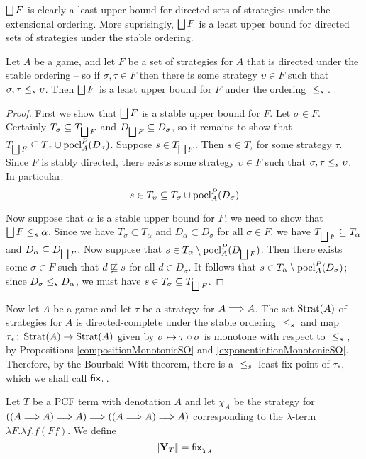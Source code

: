 \documentclass{article}
\begin{document}
$\bigsqcup F$ is clearly a least upper bound for directed sets of strategies under the extensional ordering.  More suprisingly, $\bigsqcup F$ is a least upper bound for directed sets of strategies under the stable ordering.

\begin{proposition}
  Let $A$ be a game, and let $F$ be a set of strategies for $A$ that is directed under the stable ordering -- so if $\sigma,\tau\in F$ then there is some strategy $\upsilon\in F$ such that $\sigma,\tau{\;\le_s\;}\upsilon$.  Then $\bigsqcup F$ is a least upper bound for $F$ under the ordering ${\;\le_s\;}$.
  \begin{proof}
    First we show that $\bigsqcup F$ is a stable upper bound for $F$.  Let $\sigma\in F$.  Certainly $T_\sigma\subseteq T_{\bigsqcup F}$ and $D_{\bigsqcup F}\subseteq D_\sigma$, so it remains to show that $T_{\bigsqcup F}\subseteq T_\sigma\cup \operatorname{pocl}_A^P(D_\sigma)$.  Suppose $s\in T_{\bigsqcup F}$.  Then $s\in T_\tau$ for some strategy $\tau$.  Since $F$ is stably directed, there exists some strategy $\upsilon\in F$ such that $\sigma,\tau{\;\le_s\;}\upsilon$.  In particular:
    \[
      s\in T_\upsilon \subseteq T_\sigma \cup \operatorname{pocl}_A^P(D_\sigma)
      \]

    Now suppose that $\alpha$ is a stable upper bound for $F$; we need to show that $\bigsqcup F{\;\le_s\;}\alpha$.  Since we have $T_\sigma\subset T_\alpha$ and $D_\alpha\subset D_\sigma$ for all $\sigma\in F$, we have $T_{\bigsqcup F}\subseteq T_\alpha$ and $D_\alpha\subseteq D_{\bigsqcup F}$.  Now suppose that $s\in T_\alpha\setminus\operatorname{pocl}_A^P(D_{\bigsqcup F})$.  Then there exists some $\sigma\in F$ such that $d\not\sqsubseteq s$ for all $d\in D_\sigma$.  It follows that $s\in T_\alpha\setminus\operatorname{pocl}_A^P(D_\sigma)$; since $D_\sigma{\;\le_s\;} D_\alpha$, we must have $s\in T_\sigma\subseteq T_{\bigsqcup F}$. 
  \end{proof}
\end{proposition}

Now let $A$ be a game and let $\tau$ be a strategy for $A\Longrightarrow A$.  The set $\operatorname{Strat}(A)$ of strategies for $A$ is directed-complete under the stable ordering ${\;\le_s\;}$ and map $\tau_*\colon\operatorname{Strat}(A)\to\operatorname{Strat}(A)$ given by $\sigma\mapsto\tau \circ \sigma$ is monotone with respect to ${\;\le_s\;}$, by Propositions \ref{compositionMonotonicSO} and \ref{exponentiationMonotonicSO}.  Therefore, by the Bourbaki-Witt theorem, there is a ${\;\le_s\;}$-least fix-point of $\tau_*$, which we shall call ${\mathsf{fix}}_\tau$.

Let $T$ be a PCF term with denotation $A$ and let $\chi_A$ be the strategy for $((A \Longrightarrow A) \Longrightarrow A) \Longrightarrow ((A \Longrightarrow A) \Longrightarrow A)$ corresponding to the $\lambda$-term $\lambda F.\lambda f. f(F f)$.  We define
\[
  \left\llbracket\mathbf{Y}_T\right\rrbracket = {\mathsf{fix}}_{\chi_A}
  \]
\end{document}
